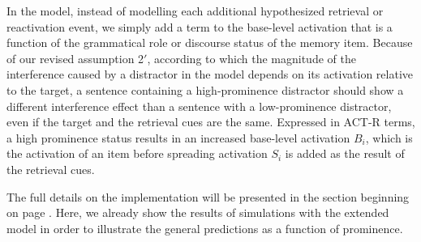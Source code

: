 \documentclass{cambridge7A}\usepackage[]{graphicx}\usepackage[]{color}
\begin{document}
In the model, instead of modelling each additional hypothesized retrieval or reactivation event, we simply add a term to the base-level activation that is a function of the grammatical role or discourse status of the memory item. Because of our revised assumption 2$'$, according to which the magnitude of the interference caused by a distractor in the model depends on its activation relative to the target, a sentence containing a high-prominence distractor should show a different interference effect than a sentence with a low-prominence distractor, even if the target and the retrieval cues are the same.
Expressed in ACT-R terms, a high prominence status results in an increased base-level activation $B_{i}$, which is the activation of an item before spreading activation $S_{i}$ is added as the result of the retrieval cues.\label{prominenceimplementationpageref}

The full details on the implementation will be presented in the section beginning on page \pageref{sec:impl}. Here, we already show the results of simulations with the extended model in order to illustrate the general predictions as a function of prominence.
\end{document}
